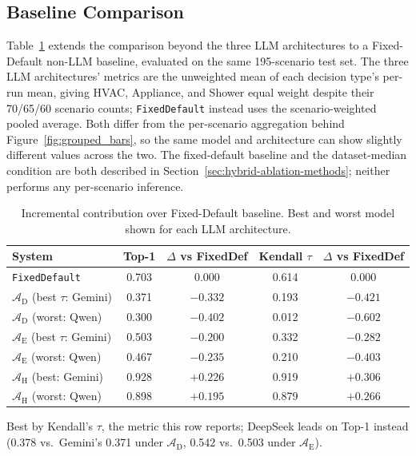 \documentclass[final,3p,times]{elsarticle}
\begin{document}
\subsection{Baseline Comparison}
\label{sec:res-baselines}
\label{sec:res-paramprov}
Table~\ref{tab:incremental-contribution} extends the comparison beyond the three LLM architectures to a Fixed-Default non-LLM baseline, evaluated on the same 195-scenario test set. The three LLM architectures' metrics are the unweighted mean of each decision type's per-run mean, giving HVAC, Appliance, and Shower equal weight despite their 70/65/60 scenario counts; \texttt{FixedDefault} instead uses the scenario-weighted pooled average. Both differ from the per-scenario aggregation behind Figure~\ref{fig:grouped_bars}, so the same model and architecture can show slightly different values across the two. The fixed-default baseline and the dataset-median condition are both described in Section~\ref{sec:hybrid-ablation-methods}; neither performs any per-scenario inference.
\begin{table}[htbp]
\centering
\begin{threeparttable}
  \footnotesize
  \centering
  \begin{tabular}{lcccc}
    \toprule
    System & Top-1 & $\Delta$ vs FixedDef & Kendall $\tau$ & $\Delta$ vs FixedDef \\
    \midrule
    \texttt{FixedDefault} & 0.703 & $0.000$ & 0.614 & $0.000$ \\
    $\mathcal{A}_{\text{D}}$ (best $\tau$: Gemini)\tnote{a} & 0.371 & $-0.332$ & 0.193 & $-0.421$ \\
    $\mathcal{A}_{\text{D}}$ (worst: Qwen)   & 0.300 & $-0.402$ & 0.012 & $-0.602$ \\
    \addlinespace
    $\mathcal{A}_{\text{E}}$ (best $\tau$: Gemini)\tnote{a} & 0.503 & $-0.200$ & 0.332 & $-0.282$ \\
    $\mathcal{A}_{\text{E}}$ (worst: Qwen)    & 0.467 & $-0.235$ & 0.210 & $-0.403$ \\
    \addlinespace
    $\mathcal{A}_{\text{H}}$ (best: Gemini) & 0.928 & $+0.226$ & 0.919 & $+0.306$ \\
    $\mathcal{A}_{\text{H}}$ (worst: Qwen)  & 0.898 & $+0.195$ & 0.879 & $+0.266$ \\
    \bottomrule
  \end{tabular}
  \begin{tablenotes}
  \footnotesize
  \item[a] Best by Kendall's $\tau$, the metric this row reports; DeepSeek leads on Top-1 instead (0.378 vs.\ Gemini's 0.371 under $\mathcal{A}_{\text{D}}$, 0.542 vs.\ 0.503 under $\mathcal{A}_{\text{E}}$).
  \end{tablenotes}
\end{threeparttable}
\caption{Incremental contribution over Fixed-Default baseline. Best and worst model shown for each LLM architecture.}
\label{tab:incremental-contribution}
\end{table}
\FloatBarrier
\end{document}
